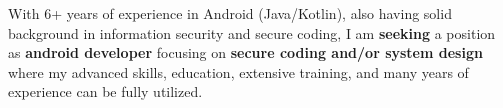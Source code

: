 

\begin{cvparagraph}


With 6+ years of experience in Android (Java/Kotlin), also having solid background in information security and secure coding, I am \textbf{seeking} a position as \textbf{android developer} focusing on \textbf{secure coding and/or system design} where my advanced skills, education, extensive training, and many years of experience can be fully utilized.

\end{cvparagraph}
